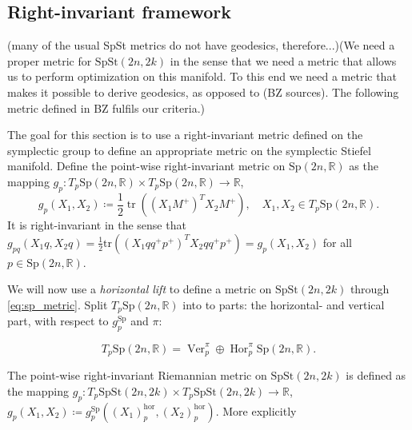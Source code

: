 \subsection{Right-invariant framework}

(many of the usual SpSt metrics do not have geodesics, therefore...)(We need a proper metric for $\mathrm{SpSt}(2n, 2k)$ in the sense that we need a metric that allows us to perform optimization on this manifold. To this end we need a metric that makes it possible to derive geodesics, as opposed to (BZ sources). The following metric defined in BZ fulfils our criteria.) 

The goal for this section is to use a right-invariant metric defined on the symplectic group to define an appropriate metric on the symplectic Stiefel manifold. Define the point-wise right-invariant metric on $\mathrm{Sp}(2n,\mathbb{R})$ as the mapping $g_{p}:T_{p}\mathrm{Sp}(2n,\mathbb{R})\times T_{p}\mathrm{Sp}(2n,\mathbb{R})\xrightarrow{}\mathbb{R}$, 
\begin{equation}\label{eq:sp_metric}
    g_{p}(X_{1},X_{2})\coloneqq\frac{1}{2}\operatorname{tr}((X_{1}M^{+})^{T}X_{2}M^{+}),\quad X_{1},X_{2}\in T_{p}\mathrm{Sp}(2n,\mathbb{R}).
\end{equation}
It is right-invariant in the sense that
$g_{pq}(X_{1}q,X_{2}q)=\tfrac{1}{2}\mathrm{tr}((X_{1}qq^{+}p^{+})^{T}X_{2}qq^{+}p^{+})=g_{p}(X_{1},X_{2})$ for all $p\in \mathrm{Sp}(2n,\mathbb{R})$.


We will now use a \textit{horizontal lift} to define a metric on $\mathrm{SpSt}(2n, 2k)$ through \ref{eq:sp_metric}. Split $T_{p}\mathrm{Sp}(2n,\mathbb{R})$ into to parts: the horizontal- and vertical part, with respect to $g^\mathrm{Sp}_{p}$ and $\pi$: %

\begin{equation}\label{eq:spst_split}
    T_{p}\mathrm{Sp}(2n,\mathbb{R})=\operatorname{Ver}^{\pi}_{p}\oplus \operatorname{Hor}^{\pi}_{p}\mathrm{Sp}(2n,\mathbb{R}).
\end{equation}

The point-wise right-invariant Riemannian metric on $\mathrm{SpSt}(2n, 2k)$ is defined as the mapping $g_{p}:T_{p}\mathrm{SpSt}(2n, 2k)\times T_{p}\mathrm{SpSt}(2n, 2k)\xrightarrow{}\mathbb{R}$, $g_{p}(X_{1},X_{2})\coloneqq g^{\mathrm{Sp}}_{p}((X_{1})^{\mathrm{hor}}_{p},(X_{2})^{\mathrm{hor}}_{p})$. More explicitly

